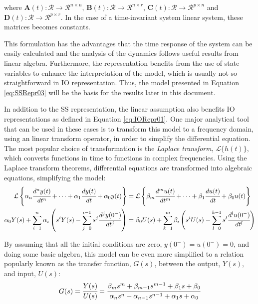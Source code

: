 \documentclass[a4paper,11pt]{book}
\numberwithin{figure}{chapter}
\numberwithin{equation}{chapter}
\numberwithin{table}{chapter}
\theoremstyle{definition}
\begin{document}
\noindent where $\mathbf{A}(t) : \mathcal{R} \rightarrow \mathcal{R}^{n \times n}$, $\mathbf{B}(t) : \mathcal{R} \rightarrow \mathcal{R}^{n \times r}$, $\mathbf{C}(t) : \mathcal{R} \rightarrow \mathcal{R}^{p \times n}$ and $\mathbf{D}(t) : \mathcal{R} \rightarrow \mathcal{R}^{p \times r}$. In the case of a time-invariant system linear system, these matrices becomes constants. 

This formulation has the advantages that the time response of the system can be easily calculated and the analysis of the dynamics follows useful results from linear algebra. Furthermore, the representation benefits from the use of state variables to enhance the interpretation of the model, which is usually not so straightforward in IO representation. Thus, the model presented in Equation \eqref{eq:SSRepr03} will be the basis for the results later in this document.

In addition to the SS representation, the linear assumption also benefits IO representations as defined in Equation \eqref{eq:IORepr01}. One major analytical tool that can be used in these cases is to transform this model to a frequency domain, using an linear transform operator, in order to simplify the differential equation. The most popular choice of transformation is the \textit{Laplace transform}, $\mathcal{L}\{ h(t) \}$, which converts functions in time to functions in complex frequencies. Using the Laplace transform theorems, differential equations are transformed into algebraic equations, simplifying the model:
\begin{equation} \label{eq:IORepr02}
\begin{split}
    \mathcal{L} \left\{\alpha_n \cfrac{d^n y(t)}{dt^n} + \cdots + \alpha_{1} \cfrac{d y(t)}{dt} + \alpha_{0} y(t) \right\}  &= \mathcal{L} \left\{ \beta_m \cfrac{d^m u(t)}{dt^m} + \cdots + \beta_{1} \cfrac{d u(t)}{dt} + \beta_{0} u(t) \right \}  \\
    \alpha_0 Y(s) + \sum_{i=1}^{n} \alpha_i \left(s^i Y(s) - \sum^{i-1}_{j = 0} s^j \cfrac{d^j y(0^-)}{dt^j} \right) &= \beta_0 U(s) + \sum_{k=1}^{m} \beta_i \left(s^i U(s) - \sum^{k-1}_{l = 0} s^l \cfrac{d^l u(0^-)}{dt^l} \right)
\end{split}
\end{equation}

By assuming that all the initial conditions are zero, $y(0^-) = u(0^-) = 0$, and doing some basic algebra, this model can be even more simplified to a relation popularly known as the transfer function, $G(s)$, between the output, $Y(s)$, and input, $U(s)$:
\begin{equation} \label{eq:transFun01}
 G(s) = \cfrac{Y(s)}{U(s)} = \cfrac{\beta_m s^m + \beta_{m-1} s^{m-1} + \beta_{1} s + \beta_0}{\alpha_n s^n + \alpha_{n-1} s^{n-1} + \alpha_{1} s + \alpha_0}
\end{equation}
\end{document}
